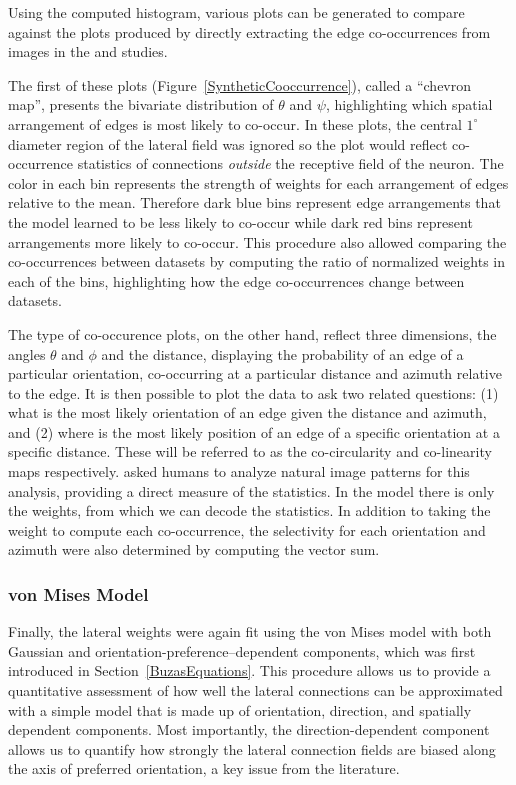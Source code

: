 Using the computed histogram, various plots can be generated to
compare against the plots produced by directly extracting the edge
co-occurrences from images in the \cite{Perrinet2015} and
\cite{Geisler2001} studies.

The first of these plots (Figure~\ref{SyntheticCooccurrence}), called
a ``chevron map'', presents the bivariate distribution of $\theta$ and
$\psi$, highlighting which spatial arrangement of edges is most likely
to co-occur. In these plots, the central $1^\circ$ diameter region of
the lateral field was ignored so the plot would reflect co-occurrence
statistics of connections \emph{outside} the receptive field of the
neuron. The color in each bin represents the strength of weights for
each arrangement of edges relative to the mean. Therefore dark blue
bins represent edge arrangements that the model learned to be less
likely to co-occur while dark red bins represent arrangements more
likely to co-occur. This procedure also allowed comparing the
co-occurrences between datasets by computing the ratio of normalized
weights in each of the bins, highlighting how the edge co-occurrences
change between datasets.

The \cite{Geisler2001} type of co-occurence plots, on the other hand,
reflect three dimensions, the angles $\theta$ and $\phi$ and the
distance, displaying the probability of an edge of a particular
orientation, co-occurring at a particular distance and azimuth
relative to the edge. It is then possible to plot the data to ask two
related questions: (1) what is the most likely orientation of an edge
given the distance and azimuth, and (2) where is the most likely
position of an edge of a specific orientation at a specific
distance. These will be referred to as the co-circularity and
co-linearity maps respectively. \cite{Geisler2001} asked humans to
analyze natural image patterns for this analysis, providing a direct
measure of the statistics. In the model there is only the weights,
from which we can decode the statistics. In addition to taking the
weight to compute each co-occurrence, the selectivity for each
orientation and azimuth were also determined by computing the vector
sum.

\subsubsection*{von Mises Model}

Finally, the lateral weights were again fit using the von Mises model
with both Gaussian and orientation-preference--dependent components,
which was first introduced in Section~\ref{BuzasEquations}. This procedure
allows us to provide a quantitative assessment of how well the lateral
connections can be approximated with a simple model that is made up of
orientation, direction, and spatially dependent components. Most
importantly, the direction-dependent component allows us to quantify
how strongly the lateral connection fields are biased along the axis
of preferred orientation, a key issue from the literature.

